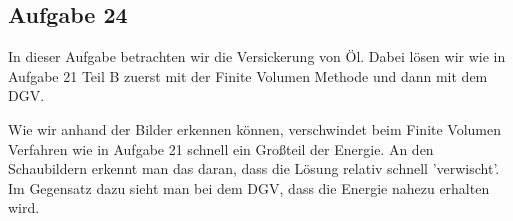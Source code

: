 \subsection{Aufgabe 24}
In dieser Aufgabe betrachten wir die Versickerung von Öl. Dabei lösen wir wie in Aufgabe 21 Teil B zuerst mit der Finite Volumen Methode und dann mit dem DGV.
\begin{figure}[H]
	\centering
\end{figure}
Wie wir anhand der Bilder erkennen können, verschwindet beim Finite Volumen Verfahren wie in Aufgabe 21 schnell ein Großteil der Energie. An den Schaubildern erkennt man das daran, dass die Lösung relativ schnell 'verwischt'. Im Gegensatz dazu sieht man bei dem DGV, dass die Energie nahezu erhalten wird.

